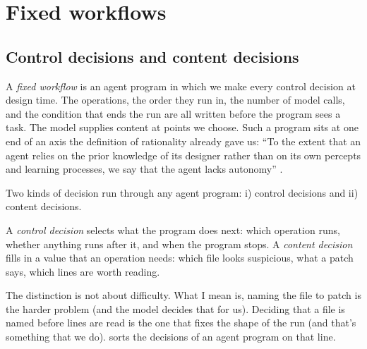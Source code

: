\section{Fixed workflows}
\label{sec:fixed}

\subsection{Control decisions and content decisions}
\label{sec:fixed-decisions}

\begin{definition}
\label{def:fixed-workflow}
A \emph{fixed workflow} is an agent program in which we make every control decision at design time. The operations, the order they run in, the number of model calls, and the condition that ends the run are all written before the program sees a task. The model supplies content at points we choose. Such a program sits at one end of an axis the definition of rationality already gave us: ``To the extent that an agent relies on the prior knowledge of its designer rather than on its own percepts and learning processes, we say that the agent lacks autonomy'' \citep[\S2.2.3]{russell2020aima}.
\end{definition}

Two kinds of decision run through any agent program: i) control decisions and ii) content
decisions. 

A \emph{control decision} selects what the program does next: which operation runs,
whether anything runs after it, and when the program stops. A \emph{content decision} fills in a
value that an operation needs: which file looks suspicious, what a patch says, which lines are
worth reading. 

The distinction is not about difficulty. What I mean is, naming the file to patch is the harder
problem (and the model decides that for us). Deciding that a file is named before lines are read is the one that fixes the shape of
the run (and that's something that we do).  sorts the decisions of an agent program on that line.

